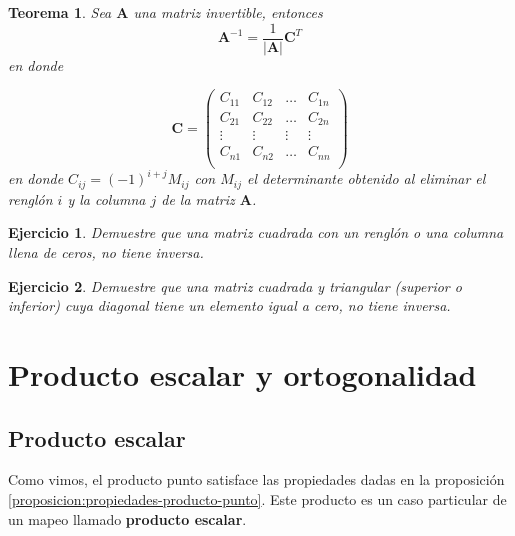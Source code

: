 \documentclass[11pt]{report}
\theoremstyle{break}
\newtheorem{teorema}{Teorema}[chapter]
\newtheorem{ejercicio}{Ejercicio}[chapter]
\theoremstyle{break}
\begin{document}
\begin{teorema}
Sea $\bm{A}$ una matriz invertible, entonces
$$
\bm{A}^{-1} = \dfrac{1}{|\bm{A}|} \bm{C}^{T}
$$
en donde 

$$
\bm{C} =
\begin{pmatrix}
C_{11} & C_{12} & \ldots & C_{1n} \\
C_{21} & C_{22} & \ldots & C_{2n} \\
\vdots & \vdots & \vdots & \vdots \\
C_{n1} & C_{n2} & \ldots & C_{nn} \\
\end{pmatrix}
$$
en donde $C_{ij} = (-1)^{i + j}M_{ij}$ con $M_{ij}$ el determinante obtenido al eliminar el renglón $i$ y la columna $j$ de la matriz $\bm{A}$.
\end{teorema}

\begin{ejercicio}
Demuestre que una matriz cuadrada con un renglón o una columna llena de ceros, no tiene inversa.
\end{ejercicio}

\begin{ejercicio}
Demuestre que una matriz cuadrada y triangular (superior o inferior) cuya diagonal tiene un elemento igual a cero, no tiene inversa.
\end{ejercicio}

\chapter{Producto escalar y ortogonalidad}
\label{capitulo:productos-escalares}

\section{Producto escalar}
\label{seccion:producto-escalar}
Como vimos, el producto punto satisface las propiedades dadas en la proposición \ref{proposicion:propiedades-producto-punto}. Este producto es un caso particular de un mapeo llamado \textbf{producto escalar}.
\end{document}
